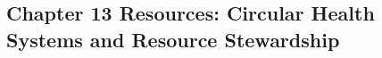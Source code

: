 \begin{refsection}
\chapter{Chapter 13 Resources: Circular Health Systems and Resource Stewardship}
\label{chap:comp-ch13}



\printbibliography[heading=subbibliography,title={Chapter 13 References}]
\end{refsection}
